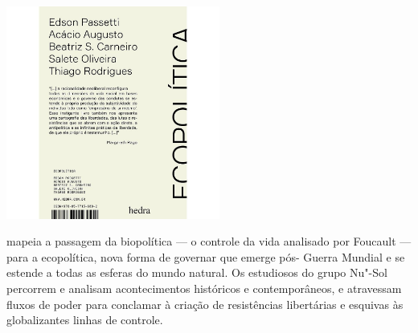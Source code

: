 \pagebreak

\hspace{.5cm}

\begin{center}
\hspace*{-3cm}
\hspace*{3cm}\includegraphics[width=70mm]{./eco.jpeg}
\end{center}

\hspace*{-7cm}\hrulefill\hspace*{-7cm}

\medskip

 mapeia a passagem da biopolítica — o controle da vida analisado por Foucault — para a ecopolítica, nova forma de governar que emerge pós- Guerra Mundial e se estende a todas as esferas do mundo natural. Os estudiosos do grupo Nu"-Sol percorrem e analisam acontecimentos históricos e contemporâneos, e atravessam fluxos de poder para conclamar à criação de resistências libertárias e esquivas às globalizantes linhas de controle.

\vfill

\hspace*{-.4cm}\begin{minipage}[c]{1\linewidth}
\small{
{}}
\end{minipage}

